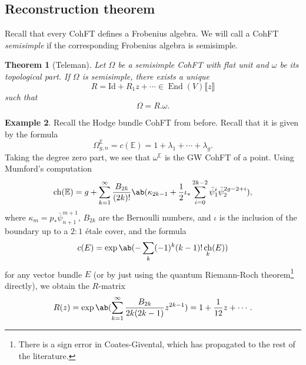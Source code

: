 \documentclass[10pt]{amsart}
\newtheorem{thm}{Theorem}[section]
\theoremstyle{definition}
\newtheorem{exm}[thm]{Example}
\theoremstyle{remark}
\theoremstyle{plain}
\theoremstyle{definition}
\theoremstyle{remark}
\newcommand{\E}{\mathbb{E}}
\newcommand{\mr}[1]{\mathrm{#1}}
\newcommand{\1}{\mathbf{1}}
\newcommand{\2}{\mathbf{2}}
\newcommand{\3}{\mathbf{3}}
\newcommand{\ps}[1]{\llbracket #1 \rrbracket}
\DeclareMathOperator{\End}{End}
\DeclareMathOperator{\ch}{ch}
\begin{document}
\subsection{Reconstruction theorem}%
\label{sub:Reconstruction theorem}

Recall that every CohFT defines a Frobenius algebra. We will call a CohFT \textit{semisimple} if the corresponding Frobenius algebra is semisimple.

\begin{thm}[Teleman]
    Let $\Omega$ be a semisimple CohFT with flat unit and $\omega$ be its topological part. If $\Omega$ is semisimple, there exists a unique 
    \[ R = \mr{Id} + R_1 z + \cdots \in \End(V)\ps{z} \]
    such that
    \[ \Omega = R.\omega. \]
\end{thm}

\begin{exm}
    Recall the Hodge bundle CohFT from before. Recall that it is given by the formula
    \[ \Omega^{\E}_{g,n} = c(\E) = 1 + \lambda_1 + \cdots + \lambda_g. \]
    Taking the degree zero part, we see that $\omega^{\E}$ is the GW CohFT of a point. Using Mumford's computation
    \[ \ch(\E) = g + \sum_{k=1}^{\infty} \frac{B_{2k}}{(2k)!}\ab(\kappa_{2k-1} + \frac{1}{2}\iota_*\sum_{i=0}^{2k-2} \bar{\psi}_1^{i} \bar{\psi}_2^{2g-2+i}), \]
    where $\kappa_{m} = p_* \bar{\psi}_{n+1}^{m+1}$, $B_{2k}$ are the Bernoulli numbers, and $\iota$ is the inclusion of the boundary up to a $2:1$ \'etale cover, and the formula
    \[ c(E) = \exp \ab(-\sum_k (-1)^k (k-1)!\ch_k(E)) \]
    for any vector bundle $E$ (or by just using the quantum Riemann-Roch theorem\footnote{There is a sign error in Coates-Givental, which has propagated to the rest of the literature.} directly), we obtain the $R$-matrix
    \[ R(z) = \exp\ab( \sum_{k=1}^{\infty} \frac{B_{2k}}{2k(2k-1)} z^{2k-1}) = 1+\frac{1}{12}z + \cdots. \]


\end{exm}
\end{document}
